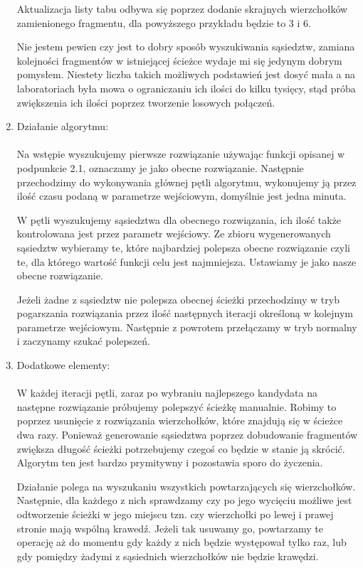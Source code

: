 \documentclass{article}
\begin{document}
\begin{enumerate}
  Aktualizacja listy tabu odbywa się poprzez dodanie skrajnych wierzchołków
  zamienionego fragmentu, dla powyższego przykładu będzie to 3 i 6.

  \vspace{5mm}
  Nie jestem pewien czy jest to dobry sposób wyszukiwania sąsiedztw, zamiana
  kolejności fragmentów w istniejącej ścieżce wydaje mi się jedynym dobrym pomysłem.
  Niestety liczba takich możliwych podstawień jest dosyć mała a na laboratoriach
  była mowa o ograniczaniu ich ilości do kilku tysięcy, stąd próba zwiększenia
  ich ilości poprzez tworzenie losowych połączeń.
  

\item \large Działanie algorytmu:\\ \normalsize\\
  Na wstępie wyszukujemy pierwsze rozwiązanie używając funkcji opisanej w
  podpunkcie 2.1, oznaczamy je jako obecne rozwiązanie. Następnie przechodzimy
  do wykonywania głównej pętli algorytmu, wykonujemy ją przez ilość czasu
  podaną w parametrze wejściowym, domyślnie jest jedna minuta.

  W pętli wyszukujemy sąsiedztwa dla obecnego rozwiązania, ich ilość także
  kontrolowana jest przez parametr wejściowy. Ze zbioru wygenerowanych sąsiedztw
  wybieramy te, które najbardziej polepsza obecne rozwiązanie czyli te, 
  dla którego wartość funkcji celu jest najmniejsza. Ustawiamy je jako nasze
  obecne rozwiązanie.
  
  Jeżeli żadne z sąsiedztw nie polepsza obecnej ścieżki przechodzimy w tryb
  pogarszania rozwiązania przez ilość następnych iteracji określoną w kolejnym
  parametrze wejściowym. Następnie z powrotem przełączamy w tryb normalny i
  zaczynamy szukać polepszeń.


\item \large Dodatkowe elementy:\\ \normalsize\\
  W każdej iteracji pętli, zaraz po wybraniu najlepszego kandydata na następne
  rozwiązanie próbujemy polepszyć ścieżkę manualnie. Robimy to poprzez usunięcie
  z rozwiązania wierzchołków, które znajdują się w ścieżce dwa razy. Ponieważ
  generowanie sąsiedztwa poprzez dobudowanie fragmentów zwiększa długość ścieżki
  potrzebujemy czegoś co będzie w stanie ją skrócić. Algorytm ten jest bardzo
  prymitywny i pozostawia sporo do życzenia.

  Działanie polega na wyszukaniu wszystkich powtarzających się wierzchołków.
  Następnie, dla każdego z nich sprawdzamy czy po jego wycięciu możliwe jest
  odtworzenie ścieżki w jego miejscu tzn. czy wierzchołki po lewej i prawej
  stronie mają wspólną krawedź. Jeżeli tak usuwamy go, powtarzamy te operację
  aż do momentu gdy każdy z nich będzie występował tylko raz, lub gdy pomiędzy
  żadymi z sąsiednich wierzchołków nie będzie krawędzi.


\end{enumerate}
\end{document}
